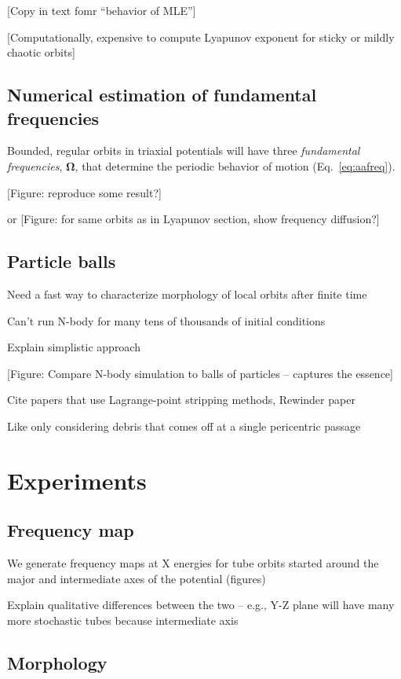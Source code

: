 \documentclass[letterpaper,12pt,preprint]{aastex}
\newcommand{\bs}[1]{\boldsymbol{#1}}
\begin{document}
[Copy in text fomr ``behavior of MLE'']

[Computationally, expensive to compute Lyapunov exponent for sticky or mildly chaotic orbits]

\subsection{Numerical estimation of fundamental frequencies}

Bounded, regular orbits in triaxial potentials will have three \emph{fundamental frequencies}, $\bs{\Omega}$, that determine the periodic behavior of motion (Eq.~\ref{eq:aafreq}).

[Figure: reproduce some result?]

or
[Figure: for same orbits as in Lyapunov section, show frequency diffusion?]

\subsection{Particle balls}

Need a fast way to characterize morphology of local orbits after finite time

Can't run N-body for many tens of thousands of initial conditions

Explain simplistic approach

[Figure: Compare N-body simulation to balls of particles -- captures the essence]

Cite papers that use Lagrange-point stripping methods, Rewinder paper

Like only considering debris that comes off at a single pericentric passage

\section{Experiments}

\subsection{Frequency map}

We generate frequency maps at X energies for tube orbits started around the major and intermediate axes of the potential (figures)

Explain qualitative differences between the two -- e.g., Y-Z plane will have many more stochastic tubes because intermediate axis

\subsection{Morphology}
\end{document}
